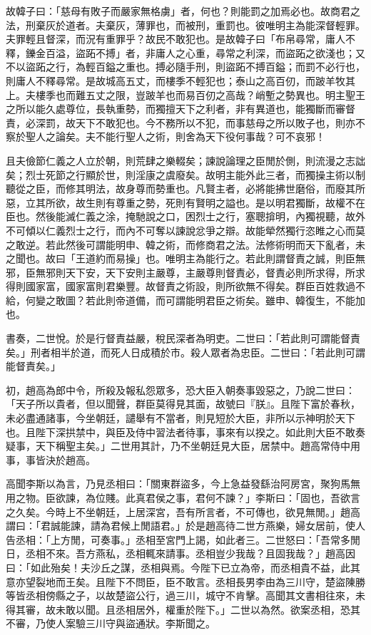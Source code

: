 \begin{pinyinscope}
故韓子曰：「慈母有敗子而嚴家無格虜」者，何也？則能罰之加焉必也。故商君之法，刑棄灰於道者。夫棄灰，薄罪也，而被刑，重罰也。彼唯明主為能深督輕罪。夫罪輕且督深，而況有重罪乎？故民不敢犯也。是故韓子曰「布帛尋常，庸人不釋，鑠金百溢，盜跖不搏」者，非庸人之心重，尋常之利深，而盜跖之欲淺也；又不以盜跖之行，為輕百鎰之重也。搏必隨手刑，則盜跖不搏百鎰；而罰不必行也，則庸人不釋尋常。是故城高五丈，而樓季不輕犯也；泰山之高百仞，而跛羊牧其上。夫樓季也而難五丈之限，豈跛羊也而易百仞之高哉？峭塹之勢異也。明主聖王之所以能久處尊位，長執重勢，而獨擅天下之利者，非有異道也，能獨斷而審督責，必深罰，故天下不敢犯也。今不務所以不犯，而事慈母之所以敗子也，則亦不察於聖人之論矣。夫不能行聖人之術，則舍為天下役何事哉？可不哀邪！

且夫儉節仁義之人立於朝，則荒肆之樂輟矣；諫說論理之臣閒於側，則流漫之志詘矣；烈士死節之行顯於世，則淫康之虞廢矣。故明主能外此三者，而獨操主術以制聽從之臣，而修其明法，故身尊而勢重也。凡賢主者，必將能拂世磨俗，而廢其所惡，立其所欲，故生則有尊重之勢，死則有賢明之謚也。是以明君獨斷，故權不在臣也。然後能滅仁義之涂，掩馳說之口，困烈士之行，塞聰揜明，內獨視聽，故外不可傾以仁義烈士之行，而內不可奪以諫說忿爭之辯。故能犖然獨行恣睢之心而莫之敢逆。若此然後可謂能明申、韓之術，而修商君之法。法修術明而天下亂者，未之聞也。故曰「王道約而易操」也。唯明主為能行之。若此則謂督責之誠，則臣無邪，臣無邪則天下安，天下安則主嚴尊，主嚴尊則督責必，督責必則所求得，所求得則國家富，國家富則君樂豐。故督責之術設，則所欲無不得矣。群臣百姓救過不給，何變之敢圖？若此則帝道備，而可謂能明君臣之術矣。雖申、韓復生，不能加也。

書奏，二世悅。於是行督責益嚴，稅民深者為明吏。二世曰：「若此則可謂能督責矣。」刑者相半於道，而死人日成積於市。殺人眾者為忠臣。二世曰：「若此則可謂能督責矣。」

初，趙高為郎中令，所殺及報私怨眾多，恐大臣入朝奏事毀惡之，乃說二世曰：「天子所以貴者，但以聞聲，群臣莫得見其面，故號曰『朕』。且陛下富於春秋，未必盡通諸事，今坐朝廷，譴舉有不當者，則見短於大臣，非所以示神明於天下也。且陛下深拱禁中，與臣及侍中習法者待事，事來有以揆之。如此則大臣不敢奏疑事，天下稱聖主矣。」二世用其計，乃不坐朝廷見大臣，居禁中。趙高常侍中用事，事皆決於趙高。

高聞李斯以為言，乃見丞相曰：「關東群盜多，今上急益發繇治阿房宮，聚狗馬無用之物。臣欲諫，為位賤。此真君侯之事，君何不諫？」李斯曰：「固也，吾欲言之久矣。今時上不坐朝廷，上居深宮，吾有所言者，不可傳也，欲見無閒。」趙高謂曰：「君誠能諫，請為君候上閒語君。」於是趙高待二世方燕樂，婦女居前，使人告丞相：「上方閒，可奏事。」丞相至宮門上謁，如此者三。二世怒曰：「吾常多閒日，丞相不來。吾方燕私，丞相輒來請事。丞相豈少我哉？且固我哉？」趙高因曰：「如此殆矣！夫沙丘之謀，丞相與焉。今陛下已立為帝，而丞相貴不益，此其意亦望裂地而王矣。且陛下不問臣，臣不敢言。丞相長男李由為三川守，楚盜陳勝等皆丞相傍縣之子，以故楚盜公行，過三川，城守不肯擊。高聞其文書相往來，未得其審，故未敢以聞。且丞相居外，權重於陛下。」二世以為然。欲案丞相，恐其不審，乃使人案驗三川守與盜通狀。李斯聞之。


\end{pinyinscope}
